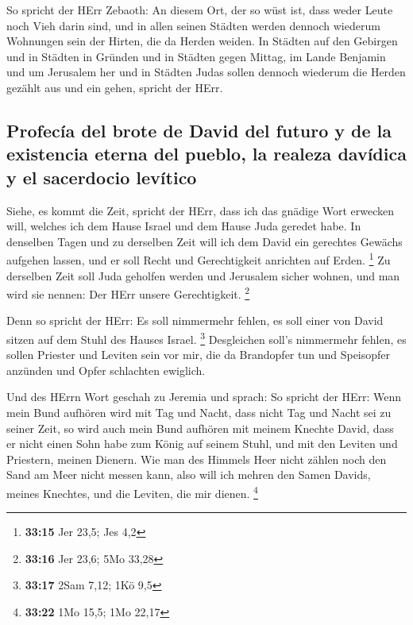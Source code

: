  So spricht der HErr Zebaoth: An diesem Ort, der so wüst
ist, dass weder Leute noch Vieh darin sind, und in allen seinen Städten
werden dennoch wiederum Wohnungen sein der Hirten, die da Herden weiden.
 In Städten auf den Gebirgen und in Städten in Gründen
und in Städten gegen Mittag, im Lande Benjamin und um Jerusalem her und
in Städten Judas sollen dennoch wiederum die Herden gezählt aus und ein
gehen, spricht der HErr.

\hypertarget{profecuxeda-del-brote-de-david-del-futuro-y-de-la-existencia-eterna-del-pueblo-la-realeza-davuxeddica-y-el-sacerdocio-levuxedtico}{%
\subsection{Profecía del brote de David del futuro y de la existencia
eterna del pueblo, la realeza davídica y el sacerdocio
levítico}\label{profecuxeda-del-brote-de-david-del-futuro-y-de-la-existencia-eterna-del-pueblo-la-realeza-davuxeddica-y-el-sacerdocio-levuxedtico}}

 Siehe, es kommt die Zeit, spricht der HErr, dass ich das
gnädige Wort erwecken will, welches ich dem Hause Israel und dem Hause
Juda geredet habe.  In denselben Tagen und zu derselben
Zeit will ich dem David ein gerechtes Gewächs aufgehen lassen, und er
soll Recht und Gerechtigkeit anrichten auf Erden. \footnote{\textbf{33:15}
  Jer 23,5; Jes 4,2}  Zu derselben Zeit soll Juda
geholfen werden und Jerusalem sicher wohnen, und man wird sie nennen:
Der HErr unsere Gerechtigkeit. \footnote{\textbf{33:16} Jer 23,6; 5Mo
  33,28}

 Denn so spricht der HErr: Es soll nimmermehr fehlen, es
soll einer von David sitzen auf dem Stuhl des Hauses Israel. \footnote{\textbf{33:17}
  2Sam 7,12; 1Kö 9,5}  Desgleichen soll's nimmermehr
fehlen, es sollen Priester und Leviten sein vor mir, die da Brandopfer
tun und Speisopfer anzünden und Opfer schlachten ewiglich.

 Und des HErrn Wort geschah zu Jeremia und sprach:
 So spricht der HErr: Wenn mein Bund aufhören wird mit
Tag und Nacht, dass nicht Tag und Nacht sei zu seiner Zeit,
 so wird auch mein Bund aufhören mit meinem Knechte
David, dass er nicht einen Sohn habe zum König auf seinem Stuhl, und mit
den Leviten und Priestern, meinen Dienern.  Wie man des
Himmels Heer nicht zählen noch den Sand am Meer nicht messen kann, also
will ich mehren den Samen Davids, meines Knechtes, und die Leviten, die
mir dienen. \footnote{\textbf{33:22} 1Mo 15,5; 1Mo 22,17}

